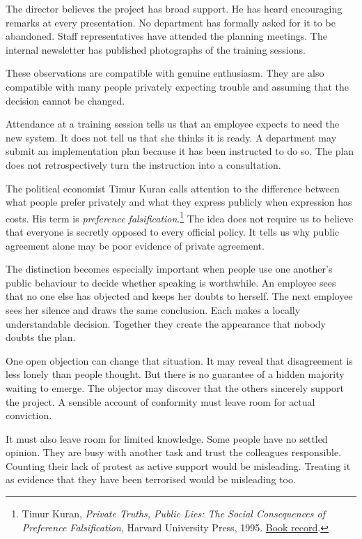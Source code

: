 \documentclass[12pt,a4paper]{book}
\begin{document}
The director believes the project has broad support. He has heard encouraging remarks at every presentation. No department has formally asked for it to be abandoned. Staff representatives have attended the planning meetings. The internal newsletter has published photographs of the training sessions.

These observations are compatible with genuine enthusiasm. They are also compatible with many people privately expecting trouble and assuming that the decision cannot be changed.

Attendance at a training session tells us that an employee expects to need the new system. It does not tell us that she thinks it is ready. A department may submit an implementation plan because it has been instructed to do so. The plan does not retrospectively turn the instruction into a consultation.

The political economist Timur Kuran calls attention to the difference between what people prefer privately and what they express publicly when expression has costs. His term is \emph{preference falsification}.\footnote{Timur Kuran, \emph{Private Truths, Public Lies: The Social Consequences of Preference Falsification}, Harvard University Press, 1995. \href{https://www.jstor.org/stable/j.ctvt1sgqt}{Book record}.} The idea does not require us to believe that everyone is secretly opposed to every official policy. It tells us why public agreement alone may be poor evidence of private agreement.

The distinction becomes especially important when people use one another's public behaviour to decide whether speaking is worthwhile. An employee sees that no one else has objected and keeps her doubts to herself. The next employee sees her silence and draws the same conclusion. Each makes a locally understandable decision. Together they create the appearance that nobody doubts the plan.

One open objection can change that situation. It may reveal that disagreement is less lonely than people thought. But there is no guarantee of a hidden majority waiting to emerge. The objector may discover that the others sincerely support the project. A sensible account of conformity must leave room for actual conviction.

It must also leave room for limited knowledge. Some people have no settled opinion. They are busy with another task and trust the colleagues responsible. Counting their lack of protest as active support would be misleading. Treating it as evidence that they have been terrorised would be misleading too.
\end{document}
